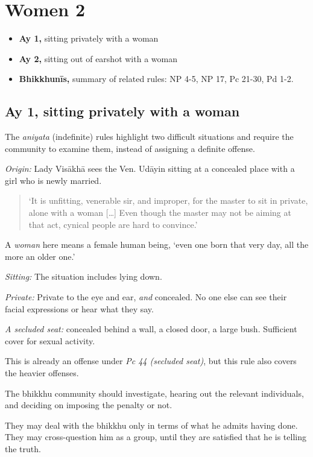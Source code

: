 \chapter{Women 2}

\begin{itemize}
\tightlist
\item
  \textbf{Ay 1,} sitting privately with a woman
\item
  \textbf{Ay 2,} sitting out of earshot with a woman
\item
  \textbf{Bhikkhunīs,} summary of related rules: NP 4-5, NP 17, Pc
  21-30, Pd 1-2.
\end{itemize}

\section{Ay 1, sitting privately with a woman}

The \emph{aniyata} (indefinite) rules highlight two difficult situations
and require the community to examine them, instead of assigning a
definite offense.

\emph{Origin:} Lady Visākhā sees the Ven. Udāyin sitting at a concealed
place with a girl who is newly married.

\begin{quote}
`It is unfitting, venerable sir, and improper, for the master to sit in
private, alone with a woman {[}\ldots{]} Even though the master may not
be aiming at that act, cynical people are hard to convince.'
\end{quote}

A \emph{woman} here means a female human being, `even one born that very
day, all the more an older one.'

\emph{Sitting:} The situation includes lying down.

\emph{Private:} Private to the eye and ear, \emph{and} concealed. No one
else can see their facial expressions or hear what they say.

\emph{A secluded seat:} concealed behind a wall, a closed door, a large
bush. Sufficient cover for sexual activity.

This is already an offense under \emph{Pc 44 (secluded seat)}, but this
rule also covers the heavier offenses.

The bhikkhu community should investigate, hearing out the relevant
individuals, and deciding on imposing the penalty or not.

They may deal with the bhikkhu only in terms of what he admits having
done. They may cross-question him as a group, until they are satisfied
that he is telling the truth.

